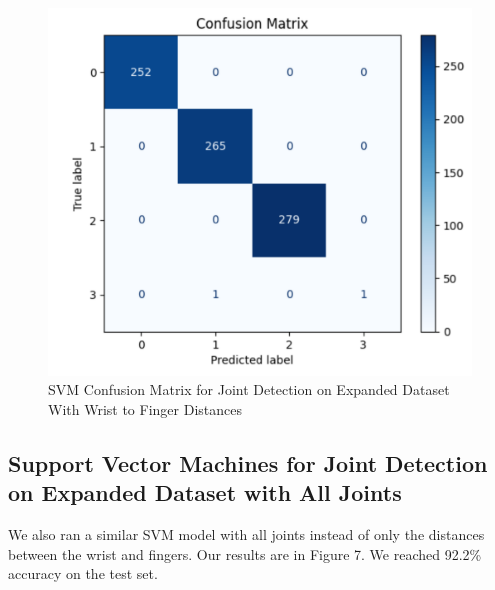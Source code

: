 \documentclass{article}
\begin{document}
\begin{figure}[h]
\begin{center}
\centerline{\includegraphics[width=\columnwidth]{svm_joint_expanded_WtoF.png}}
\caption{SVM Confusion Matrix for Joint Detection on Expanded Dataset With Wrist to Finger Distances}
\end{center}
\vskip -0.3in
\end{figure}

\subsection{Support Vector Machines for Joint Detection on Expanded Dataset with All Joints}
We also ran a similar SVM model with all joints instead of only the distances between the wrist and fingers. Our results are in Figure 7. We reached 92.2\% accuracy on the test set.
\end{document}
